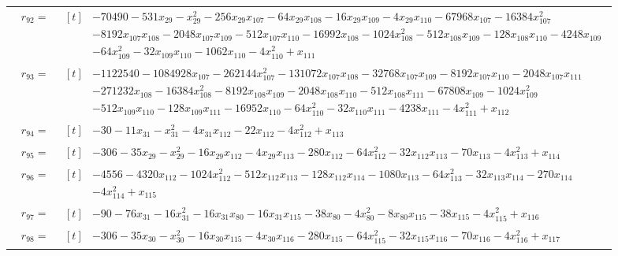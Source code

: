 \begin{longtable}{@{}r p{0.92\linewidth}@{}}
$r_{92}=$ & $\begin{aligned}[t]&-70490-531x_{29}-x_{29}^{2}-256x_{29}x_{107}-64x_{29}x_{108}-16x_{29}x_{109}-4x_{29}x_{110}-67968x_{107}-16384x_{107}^{2}\\[-1pt] &-8192x_{107}x_{108}-2048x_{107}x_{109}-512x_{107}x_{110}-16992x_{108}-1024x_{108}^{2}-512x_{108}x_{109}-128x_{108}x_{110}-4248x_{109}\\[-1pt] &-64x_{109}^{2}-32x_{109}x_{110}-1062x_{110}-4x_{110}^{2}+x_{111}\end{aligned}$ \\[2pt]
$r_{93}=$ & $\begin{aligned}[t]&-1122540-1084928x_{107}-262144x_{107}^{2}-131072x_{107}x_{108}-32768x_{107}x_{109}-8192x_{107}x_{110}-2048x_{107}x_{111}\\[-1pt] &-271232x_{108}-16384x_{108}^{2}-8192x_{108}x_{109}-2048x_{108}x_{110}-512x_{108}x_{111}-67808x_{109}-1024x_{109}^{2}\\[-1pt] &-512x_{109}x_{110}-128x_{109}x_{111}-16952x_{110}-64x_{110}^{2}-32x_{110}x_{111}-4238x_{111}-4x_{111}^{2}+x_{112}\end{aligned}$ \\[2pt]
$r_{94}=$ & $\begin{aligned}[t]&-30-11x_{31}-x_{31}^{2}-4x_{31}x_{112}-22x_{112}-4x_{112}^{2}+x_{113}\end{aligned}$ \\[2pt]
$r_{95}=$ & $\begin{aligned}[t]&-306-35x_{29}-x_{29}^{2}-16x_{29}x_{112}-4x_{29}x_{113}-280x_{112}-64x_{112}^{2}-32x_{112}x_{113}-70x_{113}-4x_{113}^{2}+x_{114}\end{aligned}$ \\[2pt]
$r_{96}=$ & $\begin{aligned}[t]&-4556-4320x_{112}-1024x_{112}^{2}-512x_{112}x_{113}-128x_{112}x_{114}-1080x_{113}-64x_{113}^{2}-32x_{113}x_{114}-270x_{114}\\[-1pt] &-4x_{114}^{2}+x_{115}\end{aligned}$ \\[2pt]
$r_{97}=$ & $\begin{aligned}[t]&-90-76x_{31}-16x_{31}^{2}-16x_{31}x_{80}-16x_{31}x_{115}-38x_{80}-4x_{80}^{2}-8x_{80}x_{115}-38x_{115}-4x_{115}^{2}+x_{116}\end{aligned}$ \\[2pt]
$r_{98}=$ & $\begin{aligned}[t]&-306-35x_{30}-x_{30}^{2}-16x_{30}x_{115}-4x_{30}x_{116}-280x_{115}-64x_{115}^{2}-32x_{115}x_{116}-70x_{116}-4x_{116}^{2}+x_{117}\end{aligned}$ \\[2pt]

\end{longtable}
